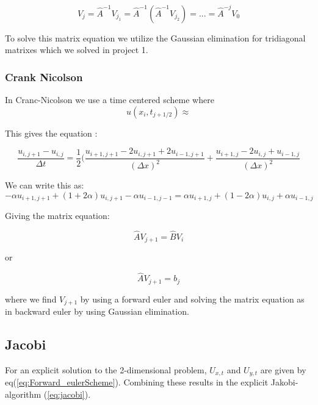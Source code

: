 \documentclass[a4paper,10pt]{article}
\begin{document}
\begin{equation}
V_j = \hat{A}^{-1}V_{j_1}  = \hat{A}^{-1}(\hat{A}^{-1}V_{j_2})= ... = \hat{A}^{-j}V_0
\label{matrix}
\end{equation}

To solve this matrix equation we utilize the Gaussian elimination for tridiagonal matrixes which we solved in project 1.

\subsubsection{Crank Nicolson}
In Cranc-Nicolson we use a time centered scheme where 
\begin{equation}
u(x_i, t_{j+1/2}) \approx 
\end{equation}

This gives the equation :

\begin{equation}
 \frac{u_{i,j+1} - u_{i,j}}{\Delta t} = \frac{1}{2}(\frac{u_{i+1,j+1} - 2u_{i,j+1} + 2u_{i-1,j+1}}{(\Delta x)^2} + \frac{u_{i+1,j} - 2u_{i,j}+u_{i-1,j}}{(\Delta x)^2}
\end{equation}

We can write this as:
\begin{equation}
 -\alpha u_{i+1,j+1} + (1+2\alpha)u_{i,j+1} - \alpha u_{i-1,j-1} =  \alpha u_{i+1,j} + (1-2\alpha)u_{i,j} + \alpha u_{i-1,j}
\end{equation}

Giving the matrix equation:

\begin{equation}
 \hat{A}V_{j+1} = \hat{B}V_{i}
\end{equation}

or

\begin{equation}
 \hat{A}V_{j+1} = b_{j}
\end{equation}

where we find $V_{j+1}$ by using a forward euler and solving the matrix equation as in backward euler by using Gaussian elimination. 

\subsection{Jacobi}
For an explicit solution to the 2-dimensional problem, $U_{x,t}$ and $U_{y,t}$ are given by eq(\ref{eq:Forward_eulerScheme}). Combining these results in the explicit Jakobi-algorithm (\ref{eq:jacobi}).
\end{document}
